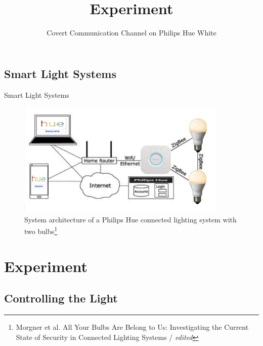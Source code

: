 \documentclass[11pt,t,usepdftitle=false,aspectratio=169]{beamer}
\begin{document}
\subsection{Smart Light Systems} %
\label{sub:smart_lights}
\begin{frame}{Smart Light Systems} %
  \begin{figure}
  	\centering
  	\includegraphics[height=5.5cm, keepaspectratio]{img/smart-light-system.png}
  	\caption{\small{System architecture of a Philips Hue connected lighting system with two bulbs}\setcounter{footnote}{3}\footnote[frame]{\tiny{Morgner et al. All Your Bulbs Are Belong to Us: Investigating the Current State of Security in Connected Lighting Systems / \textit{edited}}}}
  \end{figure}
\end{frame}


\title{Experiment}
\subtitle{Covert Communication Channel on Philips Hue White}
\section{Experiment}%
\label{sec:experiment}

\subsection{Controlling the Light} %
\label{sub:controlling_the_lights}
\end{document}

